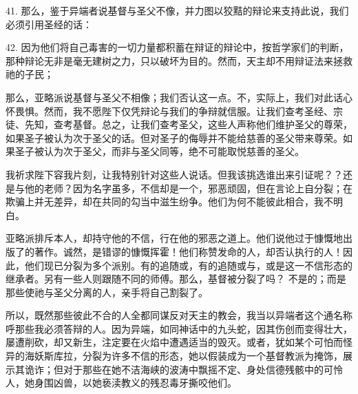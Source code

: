 41. 那么，鉴于异端者说基督与圣父不像，并力图以狡黠的辩论来支持此说，我们必须引用圣经的话：\par

42. 因为他们将自己毒害的一切力量都积蓄在辩证的辩论中，按哲学家们的判断，那种辩论无非是毫无建树之力，只以破坏为目的。然而，天主却不用辩证法来拯救祂的子民；\par

\par

那么，亚略派说基督与圣父不相像；我们否认这一点。不，实际上，我们对此话心怀畏惧。然而，我不愿陛下仅凭辩论与我们的争辩就信服。让我们查考圣经、宗徒、先知，查考基督。总之，让我们查考圣父，这些人声称他们维护圣父的尊荣，如果圣子被认为次于圣父的话。但对圣子的侮辱并不能给慈善的圣父带来尊荣。如果圣子被认为次于圣父，而非与圣父同等，绝不可能取悦慈善的圣父。\par

我祈求陛下容我片刻，让我特别针对这些人说话。但我该挑选谁出来引证呢？？还是与他的老师？因为名字虽多，不信却是一个，邪恶顽固，但在言论上自分裂；在欺骗上并无差异，却在共同的勾当中滋生纷争。他们为何不能彼此相合，我不明白。\par

亚略派排斥本人，却持守他的不信，行在他的邪恶之道上。他们说他过于慷慨地出版了的著作。诚然，是错谬的慷慨挥霍！他们称赞发命的人，却否认执行的人！因此，他们现已分裂为多个派别。有的追随或，有的追随或与，或是这一不信形态的继承者。另有一些人则跟随不同的师傅。那么，基督被分裂了吗？ 不是的；而是那些使祂与圣父分离的人，亲手将自己割裂了。\par

所以，既然那些彼此不合的人全都同谋反对天主的教会，我当以异端者这个通名称呼那些我必须答辩的人。因为异端，如同神话中的九头蛇，因其伤创而变得壮大，屡遭削砍，却又新生，注定要在火焰中遭遇适当的毁灭。或者，犹如某个可怕而怪异的海妖斯库拉，分裂为许多不信的形态，她以假装成为一个基督教派为掩饰，展示其诡诈；但对于那些在她不洁海峡的波涛中飘摇不定、身处信德残骸中的可怜人，她身围凶兽，以她亵渎教义的残忍毒牙撕咬他们。\par

